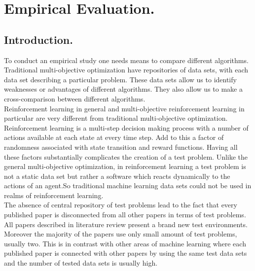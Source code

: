 \chapter{Empirical Evaluation.}

\section{Introduction.}

To conduct an empirical study one needs means to compare different algorithms. Traditional multi-objective optimization have repositories of data sets, with each data set describing a particular problem. These data sets allow us to identify weaknesses or advantages of different algorithms. They also allow us to make a cross-comparison between different algorithms.\\

Reinforcement learning in general and multi-objective reinforcement learning in particular are very different from traditional multi-objective optimization. Reinforcement learning is a multi-step decision making process with a number of actions available at each state at every time step. Add to this a factor of randomness associated with state transition and reward functions. Having all these factors substantially complicates the creation of a test problem. Unlike the general multi-objective optimization, in reinforcement learning a test problem is not a static data set but rather a software which reacts dynamically to the actions of an agent.So traditional machine learning data sets could not be used in realms of reinforcement learning. \\

The absence of central repository of test problems lead to the fact that every published paper is disconnected from all other papers in terms of test problems. All papers described in literature review present a brand new test environments. Moreover the majority of the papers use only small amount of test problems, usually two. This is in contrast with other areas of machine learning where each published paper is connected with other papers by using the same test data sets and the number of tested data sets is usually high. \\

